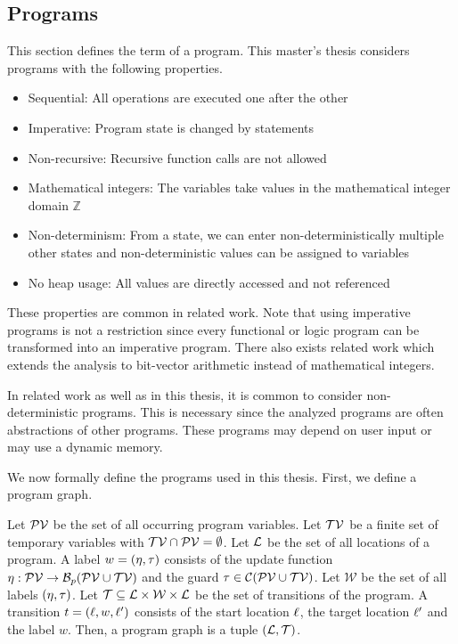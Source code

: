 \subsection{Programs}

This section defines the term of a program.
This master's thesis considers programs with the following properties.

\begin{itemize}
\item Sequential: All operations are executed one after the other
\item Imperative: Program state is changed by statements
\item Non-recursive: Recursive function calls are not allowed
\item Mathematical integers: The variables take values in the mathematical integer domain $\mathbb{Z}$
\item Non-determinism: From a state, we can enter non-deterministically multiple other states and non-deterministic values can be assigned to variables
\item No heap usage: All values are directly accessed and not referenced
\end{itemize}

These properties are common in related work.
Note that using imperative programs is not a restriction since every functional or logic program can be transformed into an imperative program. \cite{equivalence_of_languages}
There also exists related work which extends the analysis to bit-vector arithmetic instead of mathematical integers. \cite{bitvectorarithmetic}

In related work as well as in this thesis, it is common to consider non-deterministic programs.
This is necessary since the analyzed programs are often abstractions of other programs.
These programs may depend on user input or may use a dynamic memory.

We now formally define the programs used in this thesis.
First, we define a program graph.

\begin{definition} 
  Let $\mathcal{PV}$ be the set of all occurring program variables.
  Let $\mathcal{TV}$ be a finite set of temporary variables with $\mathcal{TV} \cap \mathcal{PV} = \emptyset$.
  Let $\mathcal{L}$ be the set of all locations of a program.
  A label $w = (\eta, \tau)$ consists of the update function $\eta: \mathcal{PV} \rightarrow \mathcal{B}_p(\mathcal{PV} \cup \mathcal{TV})$ and the guard $\tau \in \mathcal{C}(\mathcal{PV} \cup \mathcal{TV})$.
  Let $\mathcal{W}$ be the set of all labels $(\eta, \tau)$.
  Let $\mathcal{T} \subseteq \mathcal{L} \times \mathcal{W} \times \mathcal{L}$ be the set of transitions of the program.
  A transition $t = (\ell, w, \ell')$ consists of the start location $\ell$, the target location $\ell'$ and the label $w$.
  Then, a program graph is a tuple $(\mathcal{L}, \mathcal{T})$.
\end{definition}

